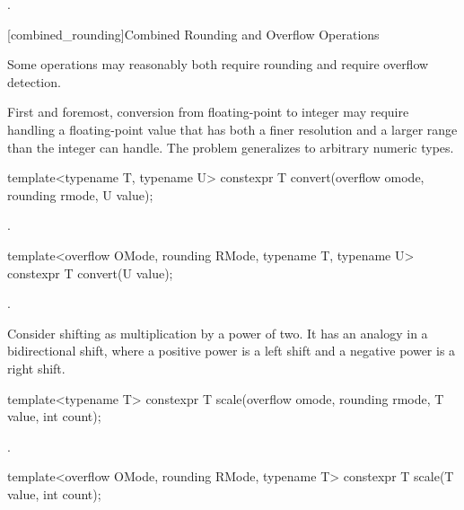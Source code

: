 \begin{addedblock}
\begin{itemdescr}
\returns {}.
\end{itemdescr}

[combined_rounding]{Combined Rounding and Overflow Operations}

Some operations may reasonably both require rounding and require overflow detection.

First and foremost, conversion from floating-point to integer may require handling a floating-point value that has both a finer resolution and a larger range than the integer can handle. The problem generalizes to arbitrary numeric types.

\begin{itemdecl}
template<typename T, typename U>
constexpr T convert(overflow omode, rounding rmode, U value);
\end{itemdecl}

\begin{itemdescr}
\returns {}.
\end{itemdescr}

\begin{itemdecl}
template<overflow OMode, rounding RMode, typename T, typename U>
constexpr T convert(U value);
\end{itemdecl}

\begin{itemdescr}
\returns {}.
\end{itemdescr}

Consider shifting as multiplication by a power of two. It has an analogy in a bidirectional shift, where a positive power is a left shift and a negative power is a right shift.

\begin{itemdecl}
template<typename T>
constexpr T scale(overflow omode, rounding rmode, T value, int count);
\end{itemdecl}

\begin{itemdescr}
\returns {}.
\end{itemdescr}

\begin{itemdecl}
template<overflow OMode, rounding RMode, typename T>
constexpr T scale(T value, int count);
\end{itemdecl}


\end{addedblock}
